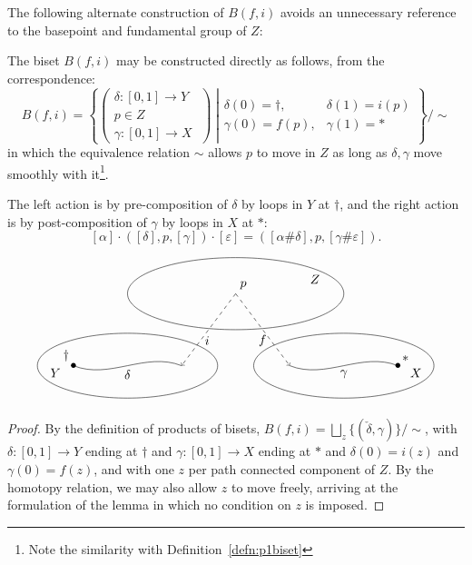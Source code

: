 \documentclass{amsart}
\begin{document}
The following alternate construction of $B(f,i)$ avoids an
unnecessary reference to the basepoint and fundamental group of $Z$:
\begin{lem}\label{lem:cpbiset}
  The biset $B(f,i)$ may be constructed directly as follows, from
  the correspondence:
  \begin{equation}\label{eq:lem:cpbiset}
    B(f,i)=\left\{\left(\begin{array}{c}\delta\colon[0,1]\to Y\\p\in Z\\\gamma\colon[0,1]\to X\end{array}\middle)\right|\begin{array}{cc}\delta(0)=\dagger,&\delta(1)=i(p)\\\gamma(0)=f(p),&\gamma(1)=*\end{array}\right\}\bigg/{\sim}
  \end{equation}
  in which the equivalence relation $\sim$ allows $p$ to move in $Z$
  as long as $\delta,\gamma$ move smoothly with it\footnote{Note the
    similarity with Definition~\ref{defn:p1biset}}.

  The left action is by pre-composition of $\delta$ by loops in $Y$ at
  $\dagger$, and the right action is by post-composition of $\gamma$ by loops in $X$ at $*$:
  \[[\alpha]\cdot([\delta],p,[\gamma])\cdot[\varepsilon]=([\alpha\#\delta],p,[\gamma\#\varepsilon]).
  \]
\end{lem}
\[\begin{tikzpicture}
  \draw (3,3) ellipse (3cm and 1cm) +(2.2,0.4) node {$Z$};
  \draw (0,1) ellipse (2.5cm and 0.9cm) +(-2,-0.2) node {$Y$};
  \draw (6,1) ellipse (2.5cm and 0.9cm) +(2,-0.2) node {$X$};
  \draw (-1.5,1) node {$\bullet$} node[above left] {$\dagger$} .. controls (-0.5,0.6) and (0.5,1.4) .. node[below] {$\delta$} (1.5,1);
  \draw (4.5,1) .. controls (5.5,0.6) and (6.5,1.4) .. node[below] {$\gamma$} (7.5,1) node {$\bullet$} node[above right] {$*$};
  \draw[dashed,->] (3,3) node[above right] {$p$} -- node [pos=0.65,right] {$i$} (1.5,1);
  \draw[dashed,->] (3,3) -- node [pos=0.65,left] {$f$} (4.5,1);
\end{tikzpicture}
\]
\begin{proof}
  By the definition of products of bisets,
  $B(f,i)=\bigsqcup_z\{(\check\delta,\gamma)\}/{\sim}$, with
  $\delta\colon[0,1]\to Y$ ending at $\dagger$ and $\gamma\colon[0,1]\to X$
  ending at $*$ and $\delta(0)=i(z)$ and $\gamma(0)=f(z)$, and with
  one $z$ per path connected component of $Z$. By the homotopy relation, we
  may also allow $z$ to move freely, arriving at the formulation of
  the lemma in which no condition on $z$ is imposed.
\end{proof}
\end{document}
